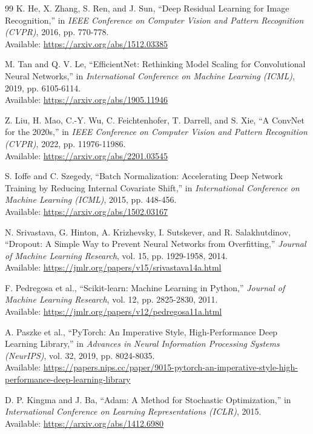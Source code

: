 \documentclass[conference]{IEEEtran}
\begin{document}
\begin{thebibliography}{99}
K. He, X. Zhang, S. Ren, and J. Sun,
``Deep Residual Learning for Image Recognition,''
in \textit{IEEE Conference on Computer Vision and Pattern Recognition (CVPR)}, 2016, pp. 770-778.\\
Available: \url{https://arxiv.org/abs/1512.03385}

M. Tan and Q. V. Le,
``EfficientNet: Rethinking Model Scaling for Convolutional Neural Networks,''
in \textit{International Conference on Machine Learning (ICML)}, 2019, pp. 6105-6114.\\
Available: \url{https://arxiv.org/abs/1905.11946}

Z. Liu, H. Mao, C.-Y. Wu, C. Feichtenhofer, T. Darrell, and S. Xie,
``A ConvNet for the 2020s,''
in \textit{IEEE Conference on Computer Vision and Pattern Recognition (CVPR)}, 2022, pp. 11976-11986.\\
Available: \url{https://arxiv.org/abs/2201.03545}

S. Ioffe and C. Szegedy,
``Batch Normalization: Accelerating Deep Network Training by Reducing Internal Covariate Shift,''
in \textit{International Conference on Machine Learning (ICML)}, 2015, pp. 448-456.\\
Available: \url{https://arxiv.org/abs/1502.03167}

N. Srivastava, G. Hinton, A. Krizhevsky, I. Sutskever, and R. Salakhutdinov,
``Dropout: A Simple Way to Prevent Neural Networks from Overfitting,''
\textit{Journal of Machine Learning Research}, vol. 15, pp. 1929-1958, 2014.\\
Available: \url{https://jmlr.org/papers/v15/srivastava14a.html}

F. Pedregosa et al.,
``Scikit-learn: Machine Learning in Python,''
\textit{Journal of Machine Learning Research}, vol. 12, pp. 2825-2830, 2011.\\
Available: \url{https://jmlr.org/papers/v12/pedregosa11a.html}

A. Paszke et al.,
``PyTorch: An Imperative Style, High-Performance Deep Learning Library,''
in \textit{Advances in Neural Information Processing Systems (NeurIPS)}, vol. 32, 2019, pp. 8024-8035.\\
Available: \url{https://papers.nips.cc/paper/9015-pytorch-an-imperative-style-high-performance-deep-learning-library}

D. P. Kingma and J. Ba,
``Adam: A Method for Stochastic Optimization,''
in \textit{International Conference on Learning Representations (ICLR)}, 2015.\\
Available: \url{https://arxiv.org/abs/1412.6980}

\end{thebibliography}
\end{document}
